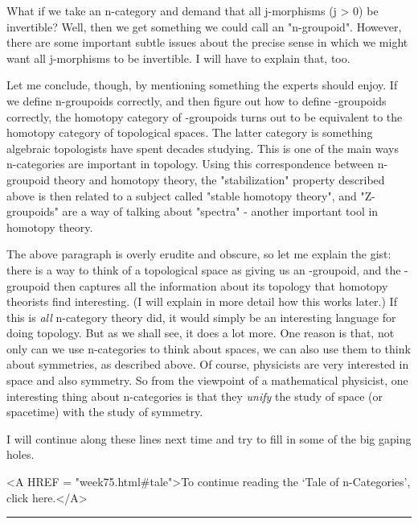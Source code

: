 What if we take an n-category and demand that all j-morphisms (j > 0) be
invertible?  Well, then we get something we could call an "n-groupoid".
However, there are some important subtle issues about the precise sense
in which we might want all j-morphisms to be invertible.  I will have to
explain that, too.  

Let me conclude, though, by mentioning something the experts should
enjoy.  If we define n-groupoids correctly, and then figure out how to
define \omega -groupoids correctly, the homotopy category of
\omega -groupoids turns out to be equivalent to the homotopy category of
topological spaces.  The latter category is something algebraic
topologists have spent decades studying.  This is one of the main ways
n-categories are important in topology.  Using this correspondence
between n-groupoid theory and homotopy theory, the
"stabilization" property described above is then related to a
subject called "stable homotopy theory", and
"Z-groupoids" are a way of talking about "spectra" -
another important tool in homotopy theory.

The above paragraph is overly erudite and obscure, so let me explain the
gist: there is a way to think of a topological space as giving us an
\omega -groupoid, and the \omega -groupoid then captures all the information
about its topology that homotopy theorists find interesting.  (I will
explain in more detail how this works later.)  If this is \emph{all}
n-category theory did, it would simply be an interesting language for
doing topology.  But as we shall see, it does a lot more.  One reason is
that, not only can we use n-categories to think about spaces, we can
also use them to think about symmetries, as described above.  Of course,
physicists are very interested in space and also symmetry.  So from the
viewpoint of a mathematical physicist, one interesting thing about
n-categories is that they \emph{unify} the study of space (or spacetime) with
the study of symmetry.

I will continue along these lines next time and try to fill in some of
the big gaping holes.  

<A HREF = "week75.html#tale">To continue reading the `Tale of
n-Categories', click here.</A>
\par\noindent\rule{\textwidth}{0.4pt}

